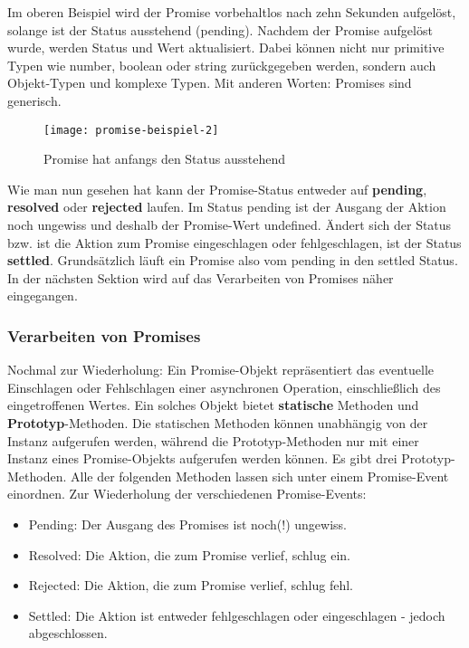 \noindent
Im oberen Beispiel wird der Promise vorbehaltlos nach zehn Sekunden aufgelöst, solange ist der Status ausstehend (pending). Nachdem der Promise aufgelöst wurde, werden Status und Wert aktualisiert. Dabei können nicht nur primitive Typen wie number, boolean oder string zurückgegeben werden, sondern auch Objekt-Typen und komplexe Typen. Mit anderen Worten: Promises sind generisch.

\begin{figure}[H]
\centering
\texttt{[image: promise-beispiel-2]}
\caption{Promise hat anfangs den Status \glqq{}ausstehend\grqq{}}
\end{figure}

\noindent
Wie man nun gesehen hat kann der Promise-Status entweder auf \textbf{pending}, \textbf{resolved} oder \textbf{rejected} laufen. Im Status pending ist der Ausgang der Aktion noch ungewiss und deshalb der Promise-Wert undefined. Ändert sich der Status bzw. ist die Aktion zum Promise eingeschlagen oder fehlgeschlagen, ist der Status \textbf{settled}. Grundsätzlich läuft ein Promise also vom pending in den settled Status. In der nächsten Sektion wird auf das Verarbeiten von Promises näher eingegangen.

\subsubsection{Verarbeiten von Promises}

Nochmal zur Wiederholung: Ein Promise-Objekt repräsentiert das eventuelle Einschlagen oder Fehlschlagen einer asynchronen Operation, einschließlich des eingetroffenen Wertes. Ein solches Objekt bietet \textbf{statische} Methoden und \textbf{Prototyp}-Methoden. Die statischen Methoden können unabhängig von der Instanz aufgerufen werden, während die Prototyp-Methoden nur mit einer Instanz eines Promise-Objekts aufgerufen werden können. Es gibt drei Prototyp-Methoden. Alle der folgenden Methoden lassen sich unter einem Promise-Event einordnen.
Zur Wiederholung der verschiedenen Promise-Events:

\begin{itemize} 
\item Pending: Der Ausgang des Promises ist noch(!) ungewiss.
\item Resolved: Die Aktion, die zum Promise verlief, schlug ein.
\item Rejected: Die Aktion, die zum Promise verlief, schlug fehl.
\item Settled: Die Aktion ist entweder fehlgeschlagen oder eingeschlagen - jedoch abgeschlossen.
\end{itemize}

